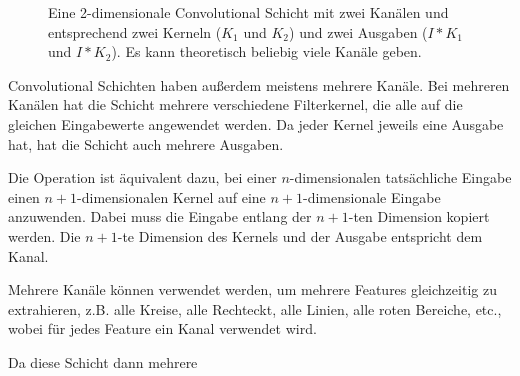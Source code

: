 \documentclass[10pt]{article}
\newcommand{\fig}[1]{\centering #1}
\begin{document}
\begin{figure}[h!]
    \caption{Eine 2-dimensionale Convolutional Schicht mit zwei Kanälen und entsprechend zwei Kerneln ($K_1$ und $K_2$) und zwei Ausgaben ($I*K_1$ und $I*K_2$). Es kann theoretisch beliebig viele Kanäle geben.}
    \label{fig:conv_layers_channels}
\end{figure}

Convolutional Schichten haben außerdem meistens mehrere Kanäle. 
Bei mehreren Kanälen hat die Schicht mehrere verschiedene Filterkernel, die alle auf die gleichen Eingabewerte angewendet werden.
Da jeder Kernel jeweils eine Ausgabe hat, hat die Schicht auch mehrere Ausgaben.

Die Operation ist äquivalent dazu, bei einer $n$-dimensionalen tatsächliche Eingabe einen $n+1$-dimensionalen Kernel auf eine $n+1$-dimensionale Eingabe anzuwenden.
Dabei muss die Eingabe entlang der $n+1$-ten Dimension kopiert werden. Die $n+1$-te Dimension des Kernels und der Ausgabe entspricht dem Kanal.

Mehrere Kanäle können verwendet werden, um mehrere Features gleichzeitig zu extrahieren, z.B. alle Kreise, alle Rechteckt, alle Linien, alle roten Bereiche, etc., wobei für jedes Feature ein Kanal verwendet wird.

Da diese Schicht dann mehrere 


\end{document}
